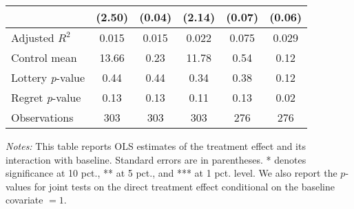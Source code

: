 \begin{table}[ht]
{\begin{threeparttable}
\begin{tabular}{l*{5}{c}}
                &   (2.50)         &   (0.04)         &   (2.14)         &   (0.07)         &   (0.06)         \\
\midrule
Adjusted \(R^{2}\)&    0.015         &    0.015         &    0.022         &    0.075         &    0.029         \\
Control mean    &    13.66         &     0.23         &    11.78         &     0.54         &     0.12         \\
Lottery \emph{p}-value&     0.44         &     0.44         &     0.34         &     0.38         &     0.12         \\
Regret \emph{p}-value&     0.13         &     0.13         &     0.11         &     0.13         &     0.02         \\
Observations    &      303         &      303         &      303         &      276         &      276         \\
\bottomrule \end{tabular} \begin{tablenotes}[flushleft] \footnotesize \item \emph{Notes:} This table reports OLS estimates of the treatment effect and its interaction with baseline. Standard errors are in parentheses. * denotes significance at 10 pct., ** at 5 pct., and *** at 1 pct. level. We also report the \(p\)-values for joint tests on the direct treatment effect conditional on the baseline covariate $= 1$. \end{tablenotes} \end{threeparttable} } \end{table}

